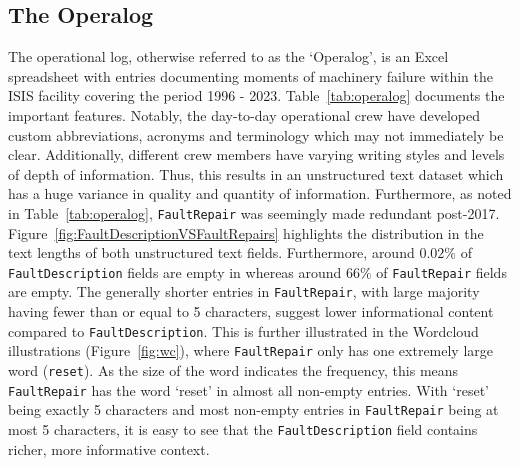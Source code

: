 \documentclass[10pt,oneside]{report}
\begin{document}
\subsection{The Operalog}
The operational log, otherwise referred to as the `Operalog', is an Excel spreadsheet with entries documenting moments of machinery failure within the ISIS facility covering the period 1996 - 2023. Table~\ref{tab:operalog} documents the important features. Notably, the day-to-day operational crew have developed custom abbreviations, acronyms and terminology which may not immediately be clear. Additionally, different crew members have varying writing styles and levels of depth of information. Thus, this results in an unstructured text dataset which has a huge variance in quality and quantity of information. Furthermore, as noted in Table~\ref{tab:operalog}, \texttt{FaultRepair} was seemingly made redundant post-2017. Figure~\ref{fig:FaultDescriptionVSFaultRepairs} highlights the distribution in the text lengths of both unstructured text fields. Furthermore, around $0.02\%$ of \texttt{FaultDescription} fields are empty in whereas around $66\%$ of \texttt{FaultRepair} fields are empty. The generally shorter entries in \texttt{FaultRepair}, with large majority having fewer than or equal to 5 characters, suggest lower informational content compared to \texttt{FaultDescription}. This is further illustrated in the Wordcloud illustrations \cite{oesper2011wordcloud} (Figure~\ref{fig:wc}), where \texttt{FaultRepair} only has one extremely large word (\texttt{reset}). As the size of the word indicates the frequency, this means \texttt{FaultRepair} has the word `reset' in almost all non-empty entries. With `reset' being exactly 5 characters and most non-empty entries in \texttt{FaultRepair} being at most 5 characters, it is easy to see that the \texttt{FaultDescription} field contains richer, more informative context. 
\end{document}
